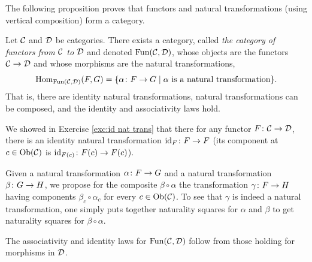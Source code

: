 \documentclass[CT4S-EN-RU]{subfiles}
\begin{document}
\begin{blockRUS}
\end{blockRUS}


\subsubsection{}

\begin{blockENG}
The following proposition proves that functors and natural transformations (using vertical composition) form a category.
\end{blockENG}

\begin{blockRUS}
\end{blockRUS}

\begin{propositionENG}\label{prop:Fun(C,D)}
Let $\mathcal{C}$ and $\mathcal{D}$ be categories. There exists a category, called {\em the category of functors from $\mathcal{C}$ to $\mathcal{D}$} and denoted $\textnormal{Fun}(\mathcal{C},\mathcal{D})$, whose objects are the functors $\mathcal{C}\rightarrow\mathcal{D}$ and whose morphisms are the natural transformations,
$$\textnormal{Hom}_{\textnormal{Fun}(\mathcal{C},\mathcal{D})}(F,G)=\{\alpha\colon F\rightarrow G{\;|\;}\alpha\textnormal{ is a natural transformation}\}.$$That is, there are identity natural transformations, natural transformations can be composed, and the identity and associativity laws hold.
\end{propositionENG}

\begin{propositionRUS}\label{prop:Fun(C,D)}
\end{propositionRUS}

\begin{proofENG}
We showed in Exercise \ref{exc:id nat trans} that there for any functor $F\colon\mathcal{C}\rightarrow\mathcal{D}$, there is an identity natural transformation $\textnormal{id}_F\colon F\rightarrow F$ (its component at $c\in\textnormal{Ob}(\mathcal{C})$ is $\textnormal{id}_{F(c)}\colon F(c)\rightarrow F(c)$). 

Given a natural transformation $\alpha\colon F\rightarrow G$ and a natural transformation $\beta\colon G\rightarrow H$, we propose for the composite $\beta\circ\alpha$ the transformation $\gamma\colon F\rightarrow H$ having components $\beta_c\circ\alpha_c$ for every $c\in\textnormal{Ob}(\mathcal{C})$. To see that $\gamma$ is indeed a natural transformation, one simply puts together naturality squares for $\alpha$ and $\beta$ to get naturality squares for $\beta\circ\alpha$. 

The associativity and identity laws for $\textnormal{Fun}(\mathcal{C},\mathcal{D})$ follow from those holding for morphisms in $\mathcal{D}$.
\end{proofENG}
\end{document}
